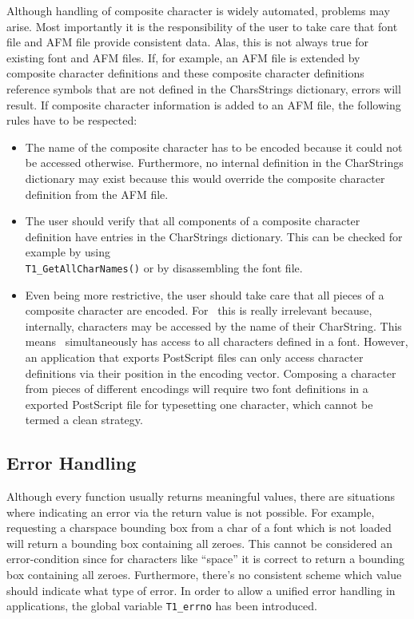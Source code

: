 Although handling of composite character is widely automated, problems may
arise. Most importantly it is the responsibility of the user to take care that
font file and AFM file provide consistent data. Alas, this is not always true
for existing font and AFM files. If, for example, an AFM file is extended by
composite character definitions and these composite character definitions
reference symbols that are not defined in the CharsStrings dictionary, errors
will result. If composite character information is added to an AFM file, the
following rules have to be respected:
\begin{itemize}
\item The name of the composite character has to be encoded because it could
  not be accessed otherwise. Furthermore, no internal definition in the
  CharStrings dictionary may exist because this would override the composite
  character definition from the AFM file.
\item The user should verify that all components of a composite character
  definition have entries in the CharStrings dictionary. This can be checked
  for example by using\\ \verb+T1_GetAllCharNames()+ or by disassembling the font
  file. 
\item Even being more restrictive, the user should take care that all pieces
  of a composite character are encoded. For \tonelib\, this is really
  irrelevant because, internally, characters may be accessed by the name of
  their CharString. This means \tonelib\ simultaneously has access to all
  characters defined in a font. However, an application that exports PostScript
  files can only access character definitions via their position in the
  encoding vector. Composing a character from pieces of different encodings
  will require two font definitions in a exported PostScript file for
  typesetting one character, which cannot be termed a clean strategy.
\end{itemize}


\subsection{Error Handling}
\label{errorhandling}%
Although every function usually returns meaningful values, there are
situations where indicating an error via the return value is not possible. For
example, requesting a charspace bounding box from a char of a font which is not
loaded will return a bounding box containing all zeroes. This cannot be
considered an error-condition since for characters like ``space'' it is
correct to return a bounding box containing all zeroes. Furthermore, there's no
consistent scheme which value should indicate what type of error. In order to
allow a unified error handling in applications, the global variable
\verb+T1_errno+ has been introduced. 

